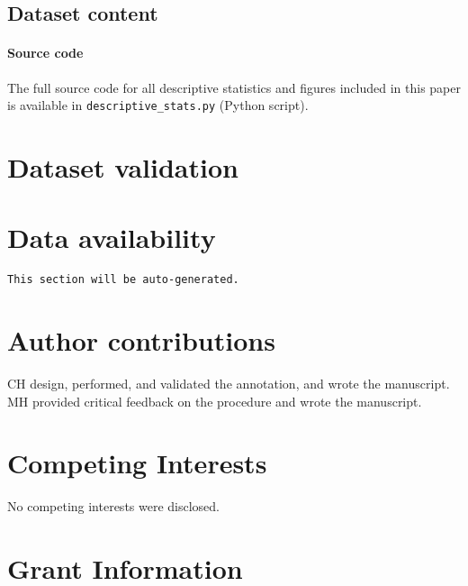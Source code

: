 \documentclass[10pt,a4paper,twocolumn]{article}
\begin{document}
\subsection*{Dataset content}


\paragraph{Source code}

The full source code for all descriptive statistics and figures included in
this paper is available in \texttt{descriptive\_stats.py} (Python script).


\section*{Dataset validation}


\section*{Data availability}

\texttt{This section will be auto-generated.}


\section*{Author contributions}
CH design, performed, and validated the annotation, and wrote the manuscript.
MH provided critical feedback on the procedure and wrote the manuscript.

\section*{Competing Interests}
No competing interests were disclosed.

\section*{Grant Information}
\end{document}
